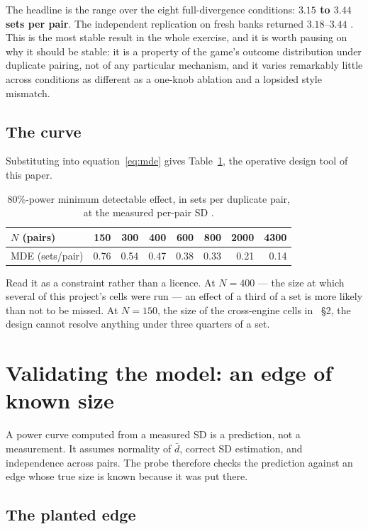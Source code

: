 \documentclass[11pt]{article}
\begin{document}
The headline is the range over the eight full-divergence conditions: \textbf{$3.15$ to $3.44$ sets
per pair}. The independent replication on fresh banks returned $3.18$--$3.44$ \cite{concession}.
This is the most stable result in the whole exercise, and it is worth pausing on why it should be
stable: it is a property of the game's outcome distribution under duplicate pairing, not of any
particular mechanism, and it varies remarkably little across conditions as different as a one-knob
ablation and a lopsided style mismatch.

\subsection{The curve}

Substituting into equation~\eqref{eq:mde} gives Table~\ref{tab:mde}, the operative design tool of
this paper.

\begin{table}[ht]
\centering
\caption{80\%-power minimum detectable effect, in sets per duplicate pair, at the measured per-pair
SD \cite{concession}.}
\label{tab:mde}
\begin{tabular}{lrrrrrrr}
\toprule
$N$ (pairs) & 150 & 300 & 400 & 600 & 800 & 2000 & 4300 \\
\midrule
MDE (sets/pair) & 0.76 & 0.54 & 0.47 & 0.38 & 0.33 & 0.21 & 0.14 \\
\bottomrule
\end{tabular}
\end{table}

Read it as a constraint rather than a licence. At $N=400$ --- the size at which several of this
project's cells were run --- an effect of a third of a set is more likely than not to be missed. At
$N=150$, the size of the cross-engine cells in \cite{crossplay}~\S2, the design cannot resolve
anything under three quarters of a set.

\section{Validating the model: an edge of known size}
\label{sec:planted}

A power curve computed from a measured SD is a prediction, not a measurement. It assumes normality
of $\bar{d}$, correct SD estimation, and independence across pairs. The probe therefore checks the
prediction against an edge whose true size is known because it was put there.

\subsection{The planted edge}
\end{document}
